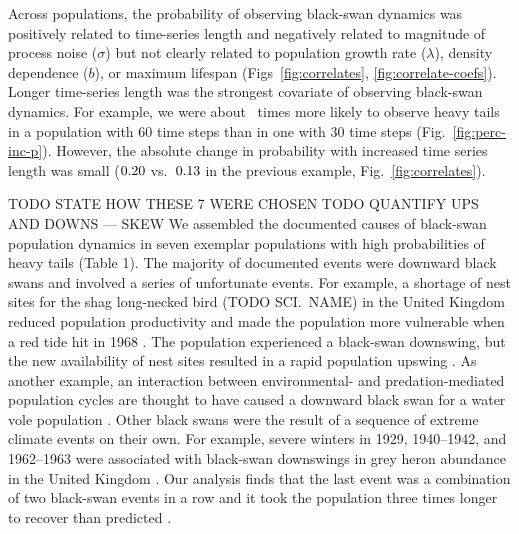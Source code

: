Across populations, the probability of observing black-swan dynamics was positively related to time-series length and negatively related to magnitude of process noise ($\sigma$) but not clearly related to population growth rate ($\lambda$), density dependence ($b$), or maximum lifespan (Figs~\ref{fig:correlates}, \ref{fig:correlate-coefs}). Longer time-series length was the strongest covariate of observing black-swan dynamics. For example, we were about \pIncHeavyNThirtyNSixty~times more likely to observe heavy tails in a population with 60 time steps than in one with 30 time steps (Fig.~\ref{fig:perc-inc-p}). However, the absolute change in probability with increased time series length was small ($0.20$ vs.\ $0.13$ in the previous example, Fig.~\ref{fig:correlates}).

TODO STATE HOW THESE 7 WERE CHOSEN
TODO QUANTIFY UPS AND DOWNS --- SKEW
We assembled the documented causes of black-swan population dynamics in seven exemplar populations with high probabilities of heavy tails (Table 1). The majority of documented events were downward black swans and involved a series of unfortunate events. For example, a shortage of nest sites for the shag long-necked bird (TODO SCI.\ NAME) in the United Kingdom reduced population productivity and made the population more vulnerable when a red tide hit in 1968 \citep{potts1980}. The population experienced a black-swan downswing, but the new availability of nest sites resulted in a rapid population upswing \citep{potts1980}. As another example, an interaction between environmental- and predation-mediated population cycles are thought to have caused a downward black swan for a water vole population \citep{saucy1994}. Other black swans were the result of a sequence of extreme climate events on their own. For example, severe winters in 1929, 1940--1942, and 1962--1963 were associated with black-swan downswings in grey heron abundance in the United Kingdom \citep{stafford1971}. Our analysis finds that the last event was a combination of two black-swan events in a row and it took the population three times longer to recover than predicted \citep{stafford1971}.


